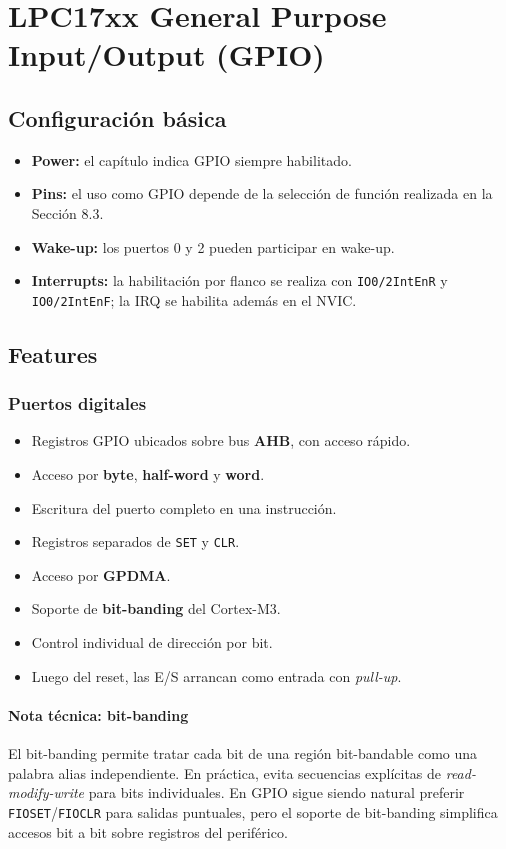 \setcounter{section}{8}
\section{LPC17xx General Purpose Input/Output (GPIO)}

\subsection{Configuración básica}
\begin{itemize}
  \item \textbf{Power:} el capítulo indica GPIO siempre habilitado.
  \item \textbf{Pins:} el uso como GPIO depende de la selección de función realizada en la Sección 8.3.
  \item \textbf{Wake-up:} los puertos 0 y 2 pueden participar en wake-up.
  \item \textbf{Interrupts:} la habilitación por flanco se realiza con \texttt{IO0/2IntEnR} y \texttt{IO0/2IntEnF}; la IRQ se habilita además en el NVIC.
\end{itemize}

\subsection{Features}
\subsubsection{Puertos digitales}
\begin{itemize}
  \item Registros GPIO ubicados sobre bus \textbf{AHB}, con acceso rápido.
  \item Acceso por \textbf{byte}, \textbf{half-word} y \textbf{word}.
  \item Escritura del puerto completo en una instrucción.
  \item Registros separados de \texttt{SET} y \texttt{CLR}.
  \item Acceso por \textbf{GPDMA}.
  \item Soporte de \textbf{bit-banding} del Cortex-M3.
  \item Control individual de dirección por bit.
  \item Luego del reset, las E/S arrancan como entrada con \textit{pull-up}.
\end{itemize}

\paragraph{Nota técnica: bit-banding}
El bit-banding permite tratar cada bit de una región bit-bandable como una palabra alias independiente. En práctica, evita secuencias explícitas de \textit{read-modify-write} para bits individuales. En GPIO sigue siendo natural preferir \texttt{FIOSET}/\texttt{FIOCLR} para salidas puntuales, pero el soporte de bit-banding simplifica accesos bit a bit sobre registros del periférico.

